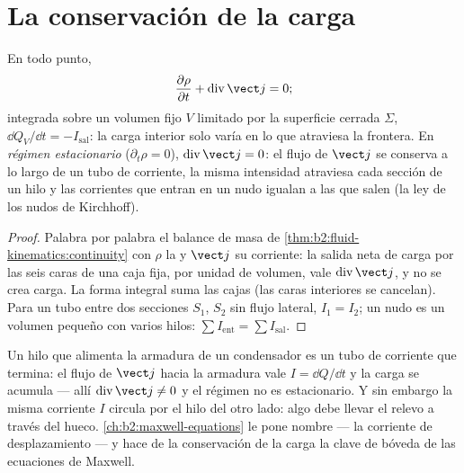 \section{La conservación de la carga}

\begin{theorem}\label{thm:b2:charges-currents-conduction:conservation}
En todo punto,
\[
\frac{\partial\rho}{\partial t} + \operatorname{div}\vect j = 0 ;
\]
integrada sobre un volumen fijo $V$ limitado por la superficie cerrada $\Sigma$,
$\dd Q_V/\dd t = -I_{\text{sal}}$: la carga interior solo varía en lo que
atraviesa la frontera. En \emph{régimen estacionario} ($\partial_t\rho = 0$),
$\operatorname{div}\vect j = 0$: el flujo de $\vect j$ se conserva a lo largo
de un tubo de corriente, la misma intensidad atraviesa cada sección de un
hilo y las corrientes que entran en un nudo igualan a las que salen (la ley de los nudos de Kirchhoff).
\end{theorem}

\begin{proof}
Palabra por palabra el balance de masa de \cref{thm:b2:fluid-kinematics:continuity}
con $\rho$ la  y $\vect j$ su corriente: la salida neta
de carga por las seis caras de una caja fija, por unidad de volumen, vale
$\operatorname{div}\vect j$, y no se crea carga. La forma integral suma las
cajas (las caras interiores se cancelan). Para un tubo entre dos secciones
$S_1$, $S_2$ sin flujo lateral, $I_1 = I_2$; un nudo es un
volumen pequeño con varios hilos: $\sum I_{\text{ent}} = \sum I_{\text{sal}}$.
\end{proof}

\begin{remark}\label{rem:b2:charges-currents-conduction:capacitor}
Un hilo que alimenta la armadura de un condensador es un tubo de corriente
que termina: el flujo de $\vect j$ hacia la armadura vale $I = \dd Q/\dd t$ y la carga se acumula
--- allí $\operatorname{div}\vect j \ne 0$ y el régimen no es estacionario.
Y sin embargo la misma corriente $I$ circula por el hilo del otro lado:
algo debe llevar el relevo a través del hueco. \cref{ch:b2:maxwell-equations}
le pone nombre --- la corriente de desplazamiento --- y hace de la
conservación de la carga la clave de bóveda de las ecuaciones de Maxwell.
\end{remark}


